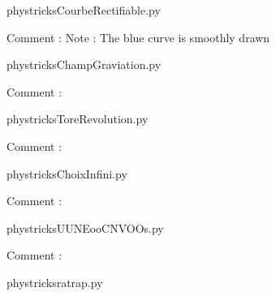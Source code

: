     \newcommand{\CaptionFigCourbeRectifiable}{<+Type your caption here+>}
    \begin{center}
        
    \end{center}
    phystricksCourbeRectifiable.py

    Comment : Note : The blue curve is smoothly drawn

    \clearpage
    


    \newcommand{\CaptionFigChampGraviation}{<+Type your caption here+>}
    \begin{center}
        
    \end{center}
    phystricksChampGraviation.py

    Comment : 

    \clearpage
    


    \newcommand{\CaptionFigToreRevolution}{<+Type your caption here+>}
    \begin{center}
        
    \end{center}
    phystricksToreRevolution.py

    Comment : 

    \clearpage
    


    \newcommand{\CaptionFigChoixInfini}{<+Type your caption here+>}
    \begin{center}
        
    \end{center}
    phystricksChoixInfini.py

    Comment : 

    \clearpage
    


    \newcommand{\CaptionFigUUNEooCNVOOs}{<+Type your caption here+>}
    \begin{center}
        
    \end{center}
    phystricksUUNEooCNVOOs.py

    Comment : 

    \clearpage
    


    \newcommand{\CaptionFigratrap}{<+Type your caption here+>}
    \begin{center}
        
    \end{center}
    phystricksratrap.py

